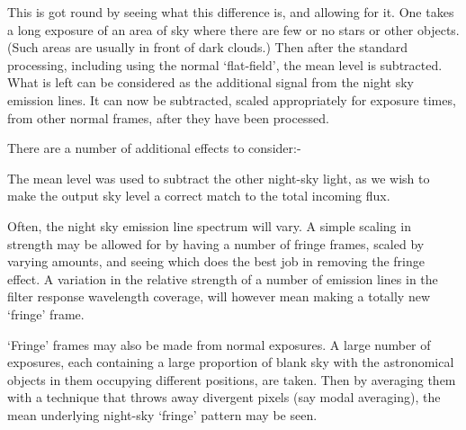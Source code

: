 \begin{small}
{{ This is got round by seeing what this difference is, and allowing for
 it. One takes a long exposure of an area of sky where there are few
 or no  stars or other objects. (Such areas are usually in front
 of dark clouds.) Then after the standard processing, including
 using the normal `flat-field', the mean level is subtracted. What
 is left can be considered as the additional signal from the night
 sky emission lines. It can now be subtracted, scaled appropriately
 for exposure times, from other normal frames, after they have been
 processed.
 
 There are a number of additional effects to consider:-
 
\begin{list}{{-}}{}
\item The mean level was used to subtract the other night-sky light,
    as we wish to make the output sky level a correct match to the
    total incoming flux.
\item Often, the night sky emission line spectrum will vary. A simple
    scaling in strength may be allowed for by having a number of
    fringe frames, scaled by varying amounts, and seeing which does
    the best job in removing the fringe effect. A variation in the
    relative strength of a number of emission lines in the filter
    response wavelength coverage, will however mean making a totally
    new `fringe' frame.
\item `Fringe' frames may also be made from normal exposures. A
    large number of exposures, each containing a large proportion
    of blank sky with the astronomical objects in them occupying
    different positions, are taken. Then by averaging them with a
    technique that throws away divergent pixels (say modal averaging),
    the mean underlying night-sky `fringe' pattern may be seen.
\end{list}
 
 
 
}}
\end{small}
